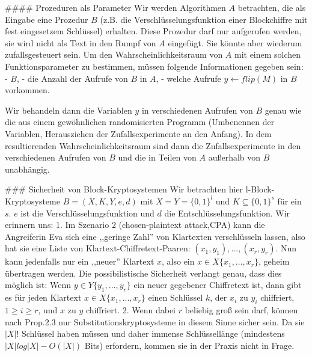 \documentclass[a4paper]{article}
\begin{document}
\begin{multicols}{3}
        #### Prozeduren als Parameter
        Wir werden Algorithmen $A$ betrachten, die als Eingabe eine Prozedur $B$ (z.B. die Verschlüsselungsfunktion einer Blockchiffre mit fest eingesetzem Schlüssel) erhalten. Diese Prozedur darf nur aufgerufen werden, sie wird nicht als Text in den Rumpf von $A$ eingefügt. Sie könnte aber wiederum zufallsgesteuert sein. Um den Wahrscheinlichkeitsraum von $A$ mit einem solchen Funktionsparameter zu bestimmen, müssen folgende Informationen gegeben sein:
        - $B$,
        - die Anzahl der Aufrufe von $B$ in $A$,
        - welche Aufrufe $y\leftarrow flip(M)$ in $B$ vorkommen.

        Wir behandeln dann die Variablen $y$ in verschiedenen Aufrufen von $B$ genau wie die aus einem gewöhnlichen randomisierten Programm (Umbenennen der Variablen, Herausziehen der Zufallsexperimente an den Anfang). In dem resultierenden Wahrscheinlichkeitsraum sind dann die Zufallsexperimente in den verschiedenen Aufrufen von $B$ und die in Teilen von $A$ außerhalb von $B$ unabhängig.

        ### Sicherheit von Block-Kryptosystemen
        Wir betrachten hier l-Block-Kryptosysteme $B=(X,K,Y,e,d)$ mit $X=Y=\{0,1\}^l$ und $K\subseteq\{0,1\}^s$ für ein $s$. $e$ ist die Verschlüsselungsfunktion und $d$ die Entschlüsselungsfunktion. Wir erinnern uns:
        1. Im Szenario 2 (chosen-plaintext attack,CPA) kann die Angreiferin Eva sich eine ,,geringe Zahl'' von Klartexten verschlüsseln lassen, also hat sie eine Liste von Klartext-Chiffretext-Paaren: $(x_1,y_1),...,(x_r,y_r)$. Nun kann jedenfalls nur ein ,,neuer'' Klartext $x$, also ein $x\in X\{x_1,...,x_r\}$, geheim übertragen werden. Die possibilistische Sicherheit verlangt genau, dass dies möglich ist: Wenn $y\in Y\{y_1,...,y_r\}$ ein neuer gegebener Chiffretext ist, dann gibt es für jeden Klartext $x\in X\{x_1,...,x_r\}$ einen Schlüssel $k$, der $x_i$ zu $y_i$ chiffriert, $1 \geq i\geq r$, und $x$ zu $y$ chiffriert.
        2. Wenn dabei $r$ beliebig groß sein darf, können nach Prop.2.3 nur Substitutionskryptosysteme in diesem Sinne sicher sein. Da sie $|X|!$ Schlüssel haben müssen und daher immense Schlüssellänge (mindestens $|X|log|X|-O(|X|)$ Bits) erfordern, kommen sie in der Praxis nicht in Frage.


\end{multicols}
\end{document}
